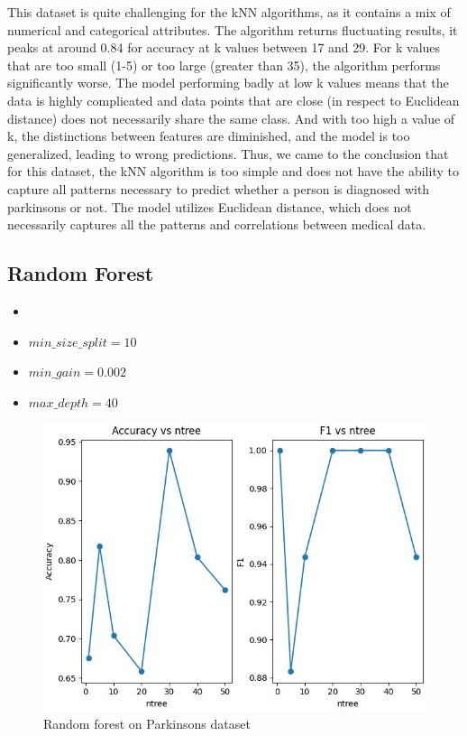 \documentclass[letterpaper]{article}
\begin{document}
This dataset is quite challenging for the kNN algorithms, as it contains a mix of numerical and categorical attributes.
The algorithm returns fluctuating results, it peaks at around 0.84 for accuracy at k values between 17 and 29.
For k values that are too small (1-5) or too large (greater than 35), the algorithm performs significantly worse.
The model performing badly at low k values means that the data is highly complicated and data points that are close (in respect to Euclidean distance) does not necessarily share the same class.
And with too high a value of k, the distinctions between features are diminished, and the model is too generalized, leading to wrong predictions.
Thus, we came to the conclusion that for this dataset, the kNN algorithm is too simple and does not have the ability to capture all patterns necessary to predict whether a person is diagnosed with parkinsons or not. The model utilizes Euclidean distance, which does not necessarily captures all the patterns and correlations between medical data.

\subsection*{Random Forest}
\begin{itemize}
	\item {}
	\item $min\_size\_split = 10$
	\item $min\_gain = 0.002$
	\item $max\_depth = 40$
\end{itemize}

\begin{figure}[H]
	\includegraphics[width=\textwidth]{figures/forest_parkinsons.csv_ig.jpg}
	\caption{Random forest on Parkinsons dataset}
	\label{fig:forest-parkinsons}
\end{figure}
\end{document}
